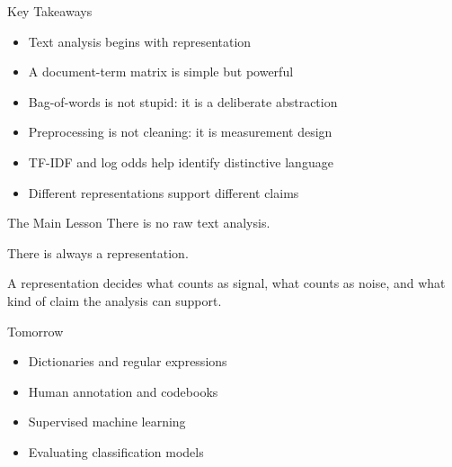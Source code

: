 \documentclass[11pt,aspectratio=43]{beamer}
\begin{document}
\begin{frame}{Key Takeaways}
\begin{itemize}
\item Text analysis begins with representation
\item A document-term matrix is simple but powerful
\item Bag-of-words is not stupid: it is a deliberate abstraction
\item Preprocessing is not cleaning: it is measurement design
\item TF-IDF and log odds help identify distinctive language
\item Different representations support different claims
\end{itemize}
\end{frame}

\begin{frame}{The Main Lesson}
\centering
\vspace{1em}
{\Large There is no raw text analysis.}
\vspace{2em}

{\Large There is always a representation.}
\vspace{2em}

A representation decides what counts as signal, what counts as noise, and what kind of claim the analysis can support.
\end{frame}

\begin{frame}{Tomorrow}
\begin{itemize}
\item Dictionaries and regular expressions
\item Human annotation and codebooks
\item Supervised machine learning
\item Evaluating classification models
\end{itemize}
\end{frame}
\end{document}
